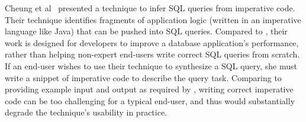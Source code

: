Cheung et al~\cite{abs-1208-2013} presented a technique to infer SQL
queries from imperative code. Their technique identifies
fragments of application logic (written in an imperative language
like Java) that can be pushed into SQL queries. 
Compared to \ourtool, their work is designed for developers
to improve a database application's performance,
rather than helping non-expert end-users
write correct SQL queries from scratch. 
If an end-user wishes to use their technique to 
synthesize a SQL query, she must write a snippet of
imperative code to describe the query task.
Comparing to providing example input
and output as required by \ourtool,
writing correct imperative code can be too challenging
for a typical end-user, and thus would
substantially degrade the technique's usability in practice.



